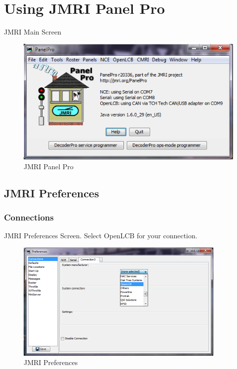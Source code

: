 \documentclass[11pt]{book}
\begin{document}
\chapter{Using JMRI Panel Pro}
JMRI Main Screen
\begin{figure}[htbp]
\begin{center}
\includegraphics[width=6in]{images/jmri.png}
\caption{JMRI Panel Pro}
\end{center}
\end{figure}

\section{JMRI Preferences}
\subsection{Connections}
JMRI Preferences Screen.  Select OpenLCB for your connection.
\begin{figure}[htbp]
\begin{center}
\includegraphics[width=4in]{images/jmri_preferences.png}
\caption{JMRI Preferences}
\end{center}
\end{figure}
\end{document}
